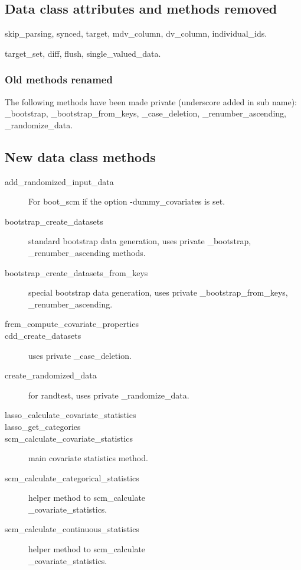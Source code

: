 \subsection{Data class attributes and methods removed}
skip\_parsing, synced, target, mdv\_column, dv\_column, individual\_ids.

target\_set, diff, flush, single\_valued\_data.

\subsubsection{Old methods renamed}
The following methods have been made private (underscore added in sub name):\\ 
\_bootstrap, \_bootstrap\_from\_keys, \_case\_deletion, \_renumber\_ascending, \\\_randomize\_data.

\subsection{New data class methods}
\begin{description} 
\item[add\_randomized\_input\_data] For boot\_scm if the option -dummy\_covariates is set.
\item[bootstrap\_create\_datasets] standard bootstrap data generation, uses private \_bootstrap, \_renumber\_ascending methods.
\item[bootstrap\_create\_datasets\_from\_keys] special bootstrap data generation, uses private \_bootstrap\_from\_keys, \_renumber\_ascending.
\item[frem\_compute\_covariate\_properties]
\item[cdd\_create\_datasets] uses private \_case\_deletion.
\item[create\_randomized\_data] for randtest, uses private \_randomize\_data.
\item[lasso\_calculate\_covariate\_statistics]
\item[lasso\_get\_categories]
\item[scm\_calculate\_covariate\_statistics] main covariate statistics method.
\item[scm\_calculate\_categorical\_statistics] helper method to scm\_calculate\\ \_covariate\_statistics.
\item[scm\_calculate\_continuous\_statistics] helper method to scm\_calculate\\ \_covariate\_statistics.
\end{description}
